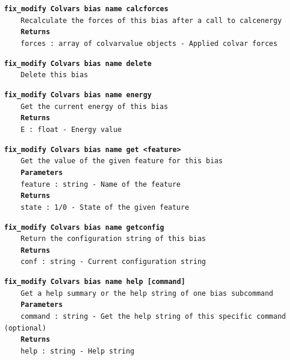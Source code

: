 \begin{mdexampleinput}{}
\texttt{\textbf{fix\_modify Colvars bias name calcforces}}
\\
\-~~~~\texttt{Recalculate the forces of this bias after a call to calcenergy}
\\
\-~~~~\texttt{\textbf{Returns}}
\\
\-~~~~\texttt{forces : array of colvarvalue objects - Applied colvar forces}
\end{mdexampleinput}
\begin{mdexampleinput}{}
\texttt{\textbf{fix\_modify Colvars bias name delete}}
\\
\-~~~~\texttt{Delete this bias}
\end{mdexampleinput}
\begin{mdexampleinput}{}
\texttt{\textbf{fix\_modify Colvars bias name energy}}
\\
\-~~~~\texttt{Get the current energy of this bias}
\\
\-~~~~\texttt{\textbf{Returns}}
\\
\-~~~~\texttt{E : float - Energy value}
\end{mdexampleinput}
\begin{mdexampleinput}{}
\texttt{\textbf{fix\_modify Colvars bias name get <feature>}}
\\
\-~~~~\texttt{Get the value of the given feature for this bias}
\\
\-~~~~\texttt{\textbf{Parameters}}
\\
\-~~~~\texttt{feature : string - Name of the feature}
\\
\-~~~~\texttt{\textbf{Returns}}
\\
\-~~~~\texttt{state : 1/0 - State of the given feature}
\end{mdexampleinput}
\begin{mdexampleinput}{}
\texttt{\textbf{fix\_modify Colvars bias name getconfig}}
\\
\-~~~~\texttt{Return the configuration string of this bias}
\\
\-~~~~\texttt{\textbf{Returns}}
\\
\-~~~~\texttt{conf : string - Current configuration string}
\end{mdexampleinput}
\begin{mdexampleinput}{}
\texttt{\textbf{fix\_modify Colvars bias name help [command]}}
\\
\-~~~~\texttt{Get a help summary or the help string of one bias subcommand}
\\
\-~~~~\texttt{\textbf{Parameters}}
\\
\-~~~~\texttt{command : string - Get the help string of this specific command (optional)}
\\
\-~~~~\texttt{\textbf{Returns}}
\\
\-~~~~\texttt{help : string - Help string}
\end{mdexampleinput}
